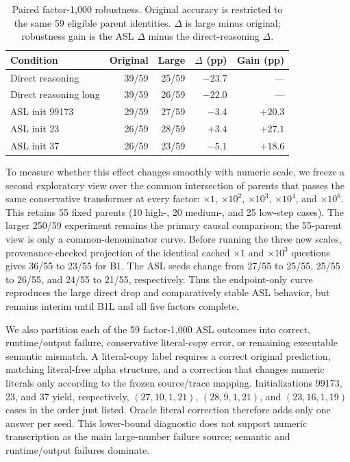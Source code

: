 \documentclass[11pt]{article}
\begin{document}
\begin{table}[t]
\centering\small
\caption{Paired factor-1,000 robustness. Original accuracy is restricted to the
same 59 eligible parent identities. $\Delta$ is large minus original; robustness
gain is the ASL $\Delta$ minus the direct-reasoning $\Delta$.}
\label{tab:gsm8k-large-contribution}
\begin{tabular}{lrrrr}
\toprule
Condition & Original & Large & $\Delta$ (pp) & Gain (pp)\\
\midrule
Direct reasoning & 39/59 & 25/59 & $-23.7$ & ---\\
Direct reasoning long & 39/59 & 26/59 & $-22.0$ & ---\\
ASL init 99173   & 29/59 & 27/59 & $-3.4$ & $+20.3$\\
ASL init 23      & 26/59 & 28/59 & $+3.4$ & $+27.1$\\
ASL init 37      & 26/59 & 23/59 & $-5.1$ & $+18.6$\\
\bottomrule
\end{tabular}
\end{table}

To measure whether this effect changes smoothly with numeric scale, we freeze a
second exploratory view over the common intersection of parents that passes the
same conservative transformer at every factor: $\times1$, $\times10^2$,
$\times10^3$, $\times10^4$, and $\times10^6$. This retains 55 fixed parents
(10 high-, 20 medium-, and 25 low-step cases). The larger 250/59 experiment
remains the primary causal comparison; the 55-parent view is only a
common-denominator curve. Before running the three new scales, provenance-checked
projection of the identical cached $\times1$ and $\times10^3$ questions gives
36/55 to 23/55 for B1. The ASL seeds change from 27/55 to 25/55, 25/55 to 26/55,
and 24/55 to 21/55, respectively. Thus the endpoint-only curve reproduces the
large direct drop and comparatively stable ASL behavior, but remains interim
until B1L and all five factors complete.

We also partition each of the 59 factor-1,000 ASL outcomes into correct,
runtime/output failure, conservative literal-copy error, or remaining executable
semantic mismatch. A literal-copy label requires a correct original prediction,
matching literal-free alpha structure, and a correction that changes numeric
literals only according to the frozen source/trace mapping. Initializations
99173, 23, and 37 yield, respectively, $(27,10,1,21)$, $(28,9,1,21)$, and
$(23,16,1,19)$ cases in the order just listed. Oracle literal correction therefore
adds only one answer per seed. This lower-bound diagnostic does not support
numeric transcription as the main large-number failure source; semantic and
runtime/output failures dominate.
\end{document}
